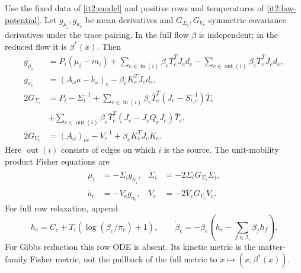 Use the fixed data of \cref{it2:model} and positive rows and temperatures of \cref{it2:law-potential}. Let $g_{\mu_i},g_{a_e}$ be mean derivatives and $G_{\Sigma_i},G_{V_e}$ symmetric covariance derivatives under the trace pairing. In the full flow $\beta$ is independent; in the reduced flow it is $\beta^*(x)$. Then
\begin{equation}
 \begin{aligned}
 g_{\mu_i}&=P_i(\mu_i-m_i)
  +\sum_{e\in\operatorname{in}(i)}\beta_e\bar T_e^TJ_ed_e
  -\sum_{e\in\operatorname{out}(i)}\beta_e\bar T_e^TJ_ed_e,\\
 g_{a_e}&=(A_\omega a-b_\omega)_e-\beta_eK_e^TJ_ed_e,\\
 2G_{\Sigma_i}&=P_i-\Sigma_i^{-1}
  +\sum_{e\in\operatorname{in}(i)}\beta_e\bar T_e^T(J_e-S_{i,e}^{-1})\bar T_e\\
 &+\sum_{e\in\operatorname{out}(i)}
             \beta_e\bar T_e^T(J_e-J_eQ_eJ_e)\bar T_e,\\
 2G_{V_e}&=(A_\omega)_{ee}-V_e^{-1}+\beta_eK_e^TJ_eK_e .
 \end{aligned}
 \label{it2:coupled-derivatives}
\end{equation}
Here $\operatorname{out}(i)$ consists of edges on which $i$ is the source. The unit-mobility product Fisher equations are
\begin{equation}
 \begin{aligned}
 \dot\mu_i&=-\Sigma_i g_{\mu_i},&
 \dot\Sigma_i&=-2\Sigma_iG_{\Sigma_i}\Sigma_i,\\
 \dot a_e&=-V_eg_{a_e},&
 \dot V_e&=-2V_eG_{V_e}V_e .
 \end{aligned}
 \label{it2:coupled-velocities}
\end{equation}
For full row relaxation, append
\begin{equation}
 h_e=C_e+T_i(\log(\beta_e/\pi_e)+1),\qquad
 \dot\beta_e=-\beta_e\left(h_e-\sum_{f\in\mathcal I_i}\beta_fh_f\right).
 \label{it2:coupled-row-flow}
\end{equation}
For Gibbs reduction this row ODE is absent. Its kinetic metric is the matter-family Fisher metric, not the pullback of the full metric to $x\mapsto(x,\beta^*(x))$.

